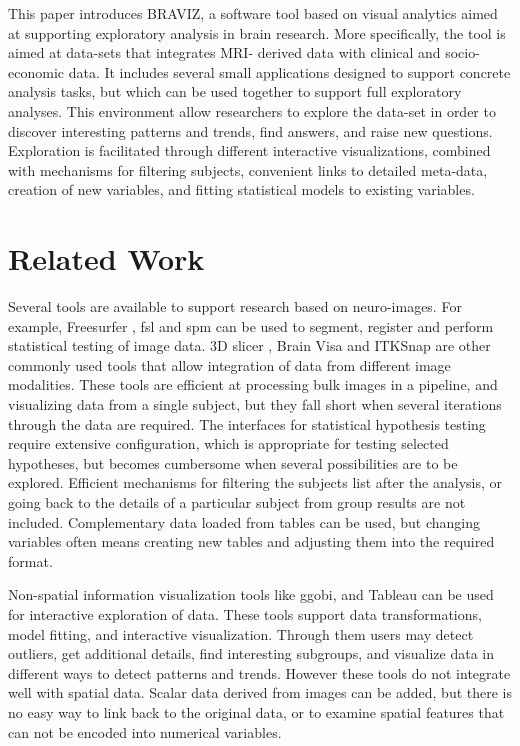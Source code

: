 \documentclass[utf8,paper]{frontiersSCNS} %
\begin{document}
This paper introduces BRAVIZ, a software tool based on visual analytics aimed at supporting exploratory analysis in brain research. More specifically, the tool is aimed at data-sets that integrates MRI- derived data with clinical and socio-economic data. It includes several small applications designed to support concrete analysis tasks, but which can be used together to support full exploratory analyses. This environment allow researchers to explore the data-set in order to discover interesting patterns and trends, find answers, and raise new questions. Exploration is facilitated through different interactive visualizations, combined with mechanisms for filtering subjects, convenient links to detailed meta-data, creation of new variables, and fitting statistical models to existing variables.

\section{Related Work}

Several tools are available to support research based on neuro-images. For example, Freesurfer  \citep{fischl_freesurfer_2012}, fsl\citep{jenkinson_fsl_2012} and spm \citep{friston_statistical_2006} can be used to segment, register and perform statistical testing of image data. 3D slicer \citep{fedorov_3d_2012}, Brain Visa \citep{cointepas_brainvisa:_2001} and ITKSnap \citep{yushkevich_user-guided_2006} are other commonly used tools that allow integration of data from different image modalities. These tools are efficient at processing bulk images in a pipeline, and visualizing data from a single subject, but they fall short when several iterations through the data are required. The interfaces for statistical hypothesis testing require extensive configuration, which is appropriate for testing selected hypotheses, but becomes cumbersome when several possibilities are to be explored. Efficient mechanisms for filtering the subjects list after the analysis, or going back to the details of a particular subject from group results are not included. Complementary data loaded from tables can be used, but changing variables often means creating new tables and adjusting them into the required format.

Non-spatial information visualization tools like ggobi\citep{cook_interactive_2007}, and Tableau\citep{hanrahan_tableau_2003} can be used for interactive exploration of data. These tools support data transformations, model fitting, and interactive visualization. Through them users may detect outliers, get additional details,  find interesting subgroups, and visualize data in different ways to detect patterns and trends. However these tools do not integrate well with spatial data. Scalar data derived from images can be added, but there is no easy way to link back  to the original data, or to examine spatial features that can not be encoded into numerical variables. 
\end{document}
